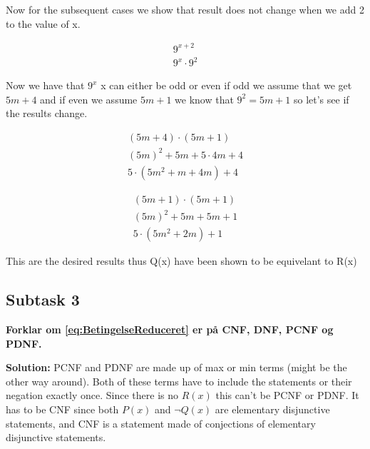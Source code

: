 Now for the subsequent cases we show that result does not change when we add 2 to the value of x.

\begin{equation}
    \begin{aligned}
        9^{x+2} \\
        9^x \cdot 9^2
    \end{aligned}
\end{equation} 

Now we have that $9^x$ x can either be odd or even if odd we assume that we get $5m+4$ and if even we assume $5m+1$ we know that $9^2=5m+1$ so let's see if the results change.

\begin{equation}
    \begin{aligned}
        (5m + 4) \cdot (5m + 1) \\ 
        (5m)^2 + 5m + 5 \cdot 4m + 4 \\
        5 \cdot (5m^2 + m + 4m) + 4
    \end{aligned}
\end{equation} 

\begin{equation}
    \begin{aligned}
        (5m + 1) \cdot (5m + 1) \\ 
        (5m)^2 + 5m + 5m + 1 \\
        5 \cdot (5m^2 + 2m) + 1
    \end{aligned}
\end{equation} 

This are the desired results thus Q(x) have been shown to be equivelant to R(x)

\subsection{Subtask 3}
\noindent
\textbf{Forklar om \eqref{eq:BetingelseReduceret} er på CNF, DNF, PCNF og PDNF.}

\bigskip
\noindent
\textbf{Solution:} PCNF and PDNF are made up of max or min terms (might be the other way around). Both of these terms have to include the statements or their negation exactly once. Since there is no $R(x)$ this can't be PCNF or PDNF. It has to be CNF since both $P(x)$ and $\neg Q(x)$ are elementary disjunctive statements, and CNF is a statement made of conjections of elementary disjunctive statements. 
